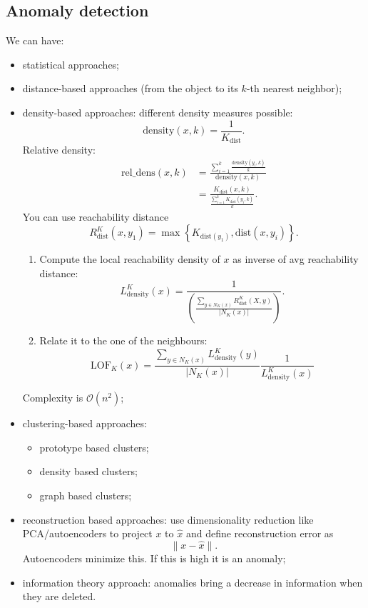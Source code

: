 \documentclass[a4paper,9pt]{extarticle}
\begin{document}
\begin{multicols*}{2}
\section{Anomaly detection}
We can have:
\begin{itemize}
	\item statistical approaches;
	\item distance-based approaches (from the object to its $k$-th nearest neighbor);
	\item density-based approaches: different density measures possible:
	\begin{equation*}
		\mathrm{density}(x,k)=\frac{1}{K_{\mathrm{dist}}}.
	\end{equation*} Relative density:
	\begin{align*}
		\mathrm{rel\_dens}(x,k)&=\frac{\sum_{i=1}^{k}\frac{\mathrm{density}(y_{i},k)}{k}}{\mathrm{density}(x,k)}\\
		&=\frac{K_{\mathrm{dist}}(x,k)}{\frac{\sum_{i=1}^{k}K_{\mathrm{dist}}(y_{i},k)}{k}}.
	\end{align*}
	You can use reachability distance
	\begin{equation*}
		R^{K}_{\mathrm{dist}}(x,y_{1})=\max\left\{K_{\mathrm{dist}(y_{1})},\mathrm{dist}(x,y_{i})\right\}.
	\end{equation*}
	\begin{riquadro}
		\begin{enumerate}
			\item Compute the local reachability density of $x$ as inverse of avg reachability distance:
			\begin{equation*}
				L^{K}_{\mathrm{density}}(x)=\frac{1}{\left(\frac{\sum_{y\in N_{K}(x)}R^{K}_{\mathrm{dist}}(X,y)}{|N_{K}(x)|}\right)}.
			\end{equation*}
			\item Relate it to the one of the neighbours:
			\begin{equation*}
				\mathrm{LOF}_{K}(x)=\frac{\sum_{y\in N_{K}(x)}L^{K}_{\mathrm{density}}(y)}{|N_{K}(x)|}\frac{1}{L^{K}_{\mathrm{density}}(x)}
			\end{equation*}
		\end{enumerate}
	\end{riquadro}
	Complexity is $\mathcal{O}(n^{2})$;
	\item clustering-based approaches:
	\begin{itemize}
		\item prototype based clusters;
		\item density based clusters;
		\item graph based clusters;
	\end{itemize}
	\item reconstruction based approaches: use dimensionality reduction like PCA/autoencoders to project $x$ to $\hat{x}$ and define reconstruction error as
	\begin{equation*}
		\lVert x-\hat{x}\rVert.
	\end{equation*}
	Autoencoders minimize this. If this is high it is an anomaly;
	\item information theory approach: anomalies bring a decrease in information when they are deleted.
\end{itemize}

\end{multicols*}
\end{document}
